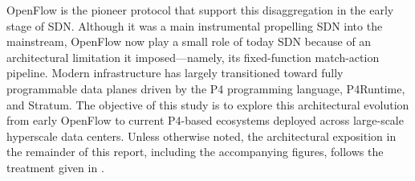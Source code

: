 OpenFlow is the pioneer protocol that support this disaggregation in the early stage of SDN. Although it was a main instrumental propelling SDN into the mainstream, OpenFlow now play a small role of today SDN because of an architectural limitation it imposed---namely, its fixed-function match-action pipeline. Modern infrastructure has largely transitioned toward fully programmable data planes driven by the P4 programming language, P4Runtime, and Stratum. The objective of this study is to explore this architectural evolution from early OpenFlow to current P4-based ecosystems deployed across large-scale hyperscale data centers. Unless otherwise noted, the architectural exposition in the remainder of this report, including the accompanying figures, follows the treatment given in \cite{systemsapproach}.

